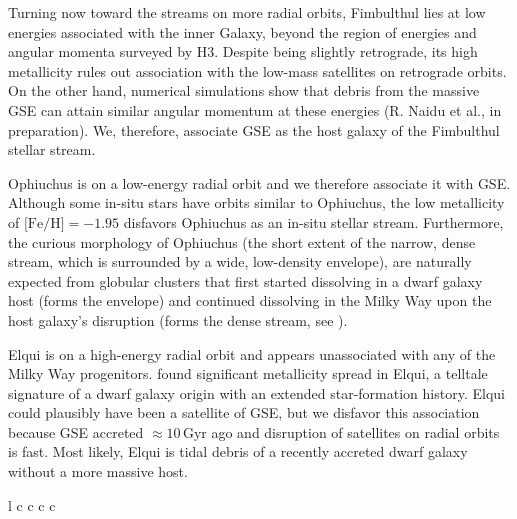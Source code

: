 \documentclass[twocolumn]{aastex63}
\newcommand{\gyr}{\ensuremath{\textrm{Gyr}}}
\newcommand{\feh}{\ensuremath{\textrm{[Fe/H]}}}
\begin{document}
Turning now toward the streams on more radial orbits, Fimbulthul lies at low energies associated with the inner Galaxy, beyond the region of energies and angular momenta surveyed by H3.
Despite being slightly retrograde, its high metallicity rules out association with the low-mass satellites on retrograde orbits.
On the other hand, numerical simulations show that debris from the massive GSE can attain similar angular momentum at these energies (R. Naidu et al., in preparation).
We, therefore, associate GSE as the host galaxy of the Fimbulthul stellar stream.

Ophiuchus is on a low-energy radial orbit and we therefore associate it with GSE.
Although some in-situ stars have orbits similar to Ophiuchus, the low metallicity of $\feh=-1.95$ \citep{sesar2015} disfavors Ophiuchus as an in-situ stellar stream.
Furthermore, the curious morphology of Ophiuchus (the short extent of the narrow, dense stream, which is surrounded by a wide, low-density envelope), are naturally expected from globular clusters that first started dissolving in a dwarf galaxy host (forms the envelope) and continued dissolving in the Milky Way upon the host galaxy's disruption (forms the dense stream, see \citealt{carlberg2018, malhan2020}).


Elqui is on a high-energy radial orbit and appears unassociated with any of the Milky Way progenitors.
\citet{ji2020} found significant metallicity spread in Elqui, a telltale signature of a dwarf galaxy origin with an extended star-formation history.
Elqui could plausibly have been a satellite of GSE, but we disfavor this association because GSE accreted $\approx10\,\gyr$ ago \citep{bonaca2020c} and disruption of satellites on radial orbits is fast.
Most likely, Elqui is tidal debris of a recently accreted dwarf galaxy without a more massive host.

\begin{deluxetable*}{l c c c c}
\decimals
\startdata

\enddata
\caption{
The origins of stellar streams in the Milky Way.
Progenitor is the object that dissolved to create the stellar stream.
The last column determines the progenitor as globular cluster (GC) or dwarf galaxy (DG).
Host galaxy is the galaxy that brought the stream progenitor into the Milky Way.
Tentative host galaxy candidates and progenitors are placed in parentheses.
}
\label{table}
\end{deluxetable*}
\end{document}
